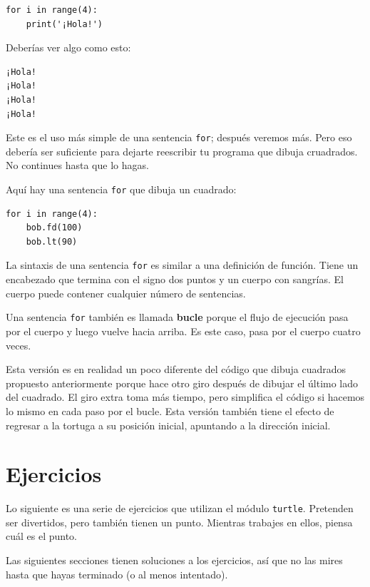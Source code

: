 \documentclass[10pt]{book}
\begin{document}
\begin{verbatim}
for i in range(4):
    print('¡Hola!')
\end{verbatim}
%
Deberías ver algo como esto:

\begin{verbatim}
¡Hola!
¡Hola!
¡Hola!
¡Hola!
\end{verbatim}
%
Este es el uso más simple de una sentencia {\tt for}; después veremos
más.  Pero eso debería ser suficiente para dejarte reescribir tu
programa que dibuja cruadrados.  No continues hasta que lo hagas.

Aquí hay una sentencia {\tt for} que dibuja un cuadrado:

\begin{verbatim}
for i in range(4):
    bob.fd(100)
    bob.lt(90)
\end{verbatim}
%
La sintaxis de una sentencia {\tt for} es similar a una definición
de función.  Tiene un encabezado que termina con el signo dos puntos y un cuerpo
con sangrías.  El cuerpo puede contener cualquier número de sentencias.

Una sentencia {\tt for} también es llamada {\bf bucle} porque
el flujo de ejecución pasa por el cuerpo y luego vuelve
hacia arriba.  Es este caso, pasa por el cuerpo cuatro veces.

Esta versión es en realidad un poco diferente del código
que dibuja cuadrados propuesto anteriormente porque hace otro giro después
de dibujar el último lado del cuadrado.  El giro extra toma
más tiempo, pero simplifica el código si hacemos lo mismo
en cada paso por el bucle.  Esta versión también tiene el efecto
de regresar a la tortuga a su posición inicial, apuntando a
la dirección inicial.

\section{Ejercicios}

Lo siguiente es una serie de ejercicios que utilizan el módulo {\tt turtle}.  Pretenden
ser divertidos, pero también tienen un punto.  Mientras trabajes en
ellos, piensa cuál es el punto.


Las siguientes secciones tienen soluciones a los ejercicios, así que
no las mires hasta que hayas terminado (o al menos intentado).
\end{document}
